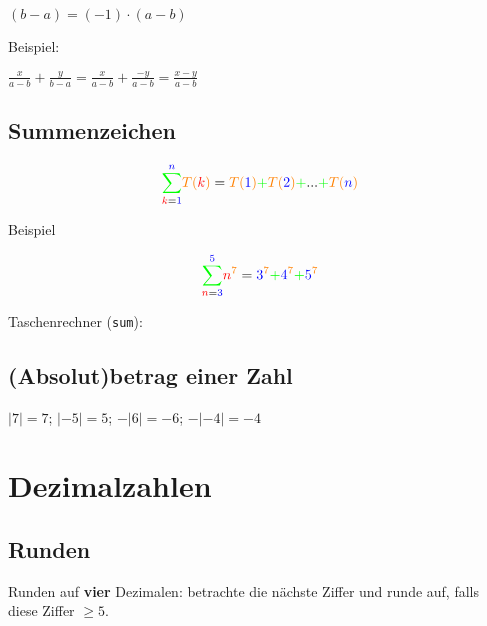 \begin{multicols}{2}
$(b-a)=(-1)\cdot{}(a-b)$

Beispiel:

$\frac{x}{a-b} +  \frac{y}{b-a} = \frac{x}{a-b} + \frac{-y}{a-b} = \frac{x-y}{a-b}$

\subsection*{Summenzeichen}

  $${\color{green}\sum_{{\color{red}k}{{\color{green}{\color{black}=}\color{blue}1}}}^{\color{blue}n\color{green}}}
  {\color{orange}T(}{{\color{red}k}}{\color{orange})} = {\color{orange}T(}{\color{blue}1}{\color{orange})} {\color{green}+} {\color{orange}T(}{\color{blue}2}{\color{orange})} {\color{green}+}
  ... {\color{green}+} {\color{orange}T(}{\color{blue}n}{\color{orange})}$$

Beispiel

  $${\color{green}\sum_{{\color{red}n}{{\color{green}{\color{black}=}\color{blue}3}}}^{\color{blue}5\color{green}}}  {\color{red}n}^{{\color{orange}7}} = {\color{blue}3}^{\color{orange}7} {\color{green}+} {\color{blue}4}^{\color{orange}7} {\color{green}+} {\color{blue}5}^{\color{orange}7}$$


Taschenrechner (\texttt{sum}): 


\subsection*{(Absolut)betrag einer Zahl}

$|7| = 7$;  \hfill{ } $|-5| = 5$; \hfill{} $-|6|=-6$; \hfill{} $-|-4| = -4$

\TRAINER{Intervall-Schreibweise? \zB $a\in[0;1[$}

\hrulefill

\section*{Dezimalzahlen}
\subsection*{Runden}
Runden auf \textbf{\color{ForestGreen}vier}  Dezimalen: betrachte die nächste Ziffer und runde auf, falls diese {\color{red}Ziffer} $\ge 5$.


\end{multicols}
